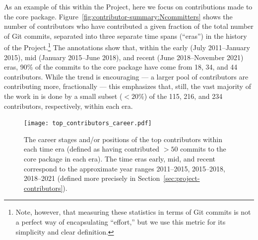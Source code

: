 \documentclass[modern]{aastex631}
\begin{document}
As an example of this within the \astropy Project, here we focus on
contributions made to the \astropypkg core package.
Figure~\ref{fig:contributor-summary:Ncommitters} shows the number of
contributors who have contributed a given fraction of the total number of Git
commits, separated into three separate time spans (``eras'') in the history of
the Project.\footnote{Note, however, that measuring these statistics in terms of
Git commits is not a perfect way of encapsulating ``effort,'' but we use this
metric for its simplicity and clear definition.}
The annotations show that, within the early (July 2011--January 2015), mid
(January 2015--June 2018), and recent (June 2018--November 2021) eras, 90\% of
the commits to the \astropypkg core package have come from 18, 34, and 44
contributors.
While the trend is encouraging --- a larger pool of contributors are
contributing more, fractionally --- this emphasizes that, still, the vast
majority of the work in \astropypkg is done by a small subset ($<20\%$) of the
115, 216, and 234 contributors, respectively, within each era.

\begin{figure}[t!]
    \begin{centering}
      \texttt{[image: top\_contributors\_career.pdf]}
        \caption{
            The career stages and/or positions of the top contributors within
            each time era (defined as having contributed $>50$ commits to the
            \astropypkg core package in each era).
            The time eras early, mid, and recent correspond to the approximate
            year ranges 2011--2015, 2015--2018, 2018--2021 (defined more
            precisely in Section~\ref{sec:project-contributors}).
        }
        \label{fig:contributor-summary:top}
    \end{centering}
\end{figure}
\end{document}
